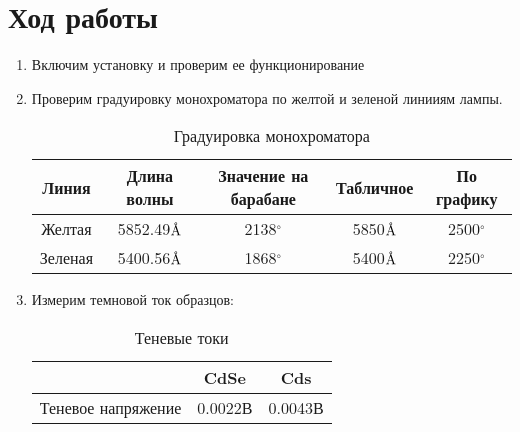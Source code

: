 \documentclass[a4paper, 12pt]{article}
\newcommand{\angstrom}{\textup{\AA}}
\begin{document}
	\section{Ход работы}
	\begin{enumerate}
		\item Включим установку и проверим ее функционирование
		\item Проверим градуировку монохроматора по желтой и зеленой линииям лампы.
		\begin{table}[!htb]
			\centering
			\caption{Градуировка монохроматора}
			\begin{tabular}{|c|c|c||c|c|}
				\hline
				Линия & Длина волны & Значение на барабане & Табличное & По графику\\
				\hline
				Желтая & 5852.49$\angstrom$ & 2138$^{\circ}$ & 5850$\angstrom$ & 2500$^{\circ}$\\
				Зеленая & 5400.56$\angstrom$ & 1868$^{\circ}$ & 5400$\angstrom$ & 2250$^{\circ}$\\
				\hline
			\end{tabular}
		\end{table}
		\item Измерим темновой ток образцов:
		\begin{table}[!htb]
			\centering
			\caption{Теневые токи}
			\begin{tabular}{|c|c|c|}
				\hline
				& CdSe & Cds\\
				\hline
				Теневое напряжение & 0.0022В & 0.0043В\\
				\hline
			\end{tabular}
		\end{table}
	\end{enumerate}
\end{document}
